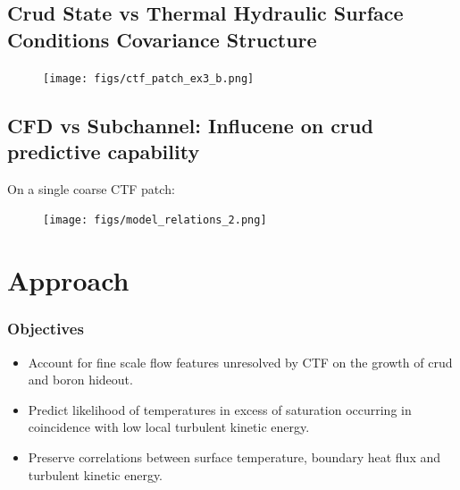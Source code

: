 \documentclass[t, pdftex]{beamer}
\begin{document}
\subsection*{Crud State vs Thermal Hydraulic Surface Conditions Covariance Structure}
\begin{frame}
\begin{figure}[]
    \vspace{-16.5pt}
    \centering
    \texttt{[image: figs/ctf\_patch\_ex3\_b.png]}
    \label{model_overview}
\end{figure}
\end{frame}

\subsection*{CFD vs Subchannel:  Influcene on crud predictive capability}
\begin{frame}
On a single coarse CTF patch:
\vspace{-6.5pt}
\begin{figure}[!htbp]
    \centering
    \texttt{[image: figs/model\_relations\_2.png]}
    \label{model_overview}
\end{figure}
\end{frame}

\section{Approach}
\begin{frame}\frametitle{Objectives}
\begin{itemize}
    \item Account for fine scale flow features unresolved by CTF on the growth of crud and boron hideout. \\

    \item Predict likelihood of temperatures in excess of saturation occurring in coincidence with low local turbulent kinetic energy. \\
    
    \item Preserve correlations between surface temperature, boundary heat flux and turbulent kinetic energy.
\end{itemize}
\end{frame}
\end{document}
